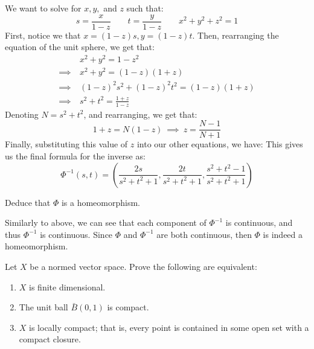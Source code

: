 \begin{soln}
    We want to solve for $ x, y, $ and $ z $ such that:
    \begin{equation*}
        s = \frac{x}{1-z} \qquad t = \frac{y}{1-z} \qquad x^{2}+y^{2}+z^{2}=1
    \end{equation*}
    First, notice we that $ x = (1-z)s, y = (1-z)t $.
    Then, rearranging the equation of the unit sphere, we get that:
    \begin{align*}
        & x^{2} + y^{2} = 1 - z^{2} \\
        \implies \ & x^{2} + y^{2} = (1-z)(1+z) \\
        \implies \ & (1-z)^{2}s^{2} + (1-z)^{2}t^{2} = (1-z)(1+z) \\
        \implies \ & s^{2} + t^{2} = \frac{1+z}{1-z}
    \end{align*}
    Denoting $ N = s^{2} + t^{2} $, and rearranging, we get that:
    \begin{equation*}
        1 + z = N(1 - z) \ \implies \ z = \frac{N - 1}{N + 1}
    \end{equation*}
    Finally, substituting this value of $ z $ into our other equations, we have:
    This gives us the final formula for the inverse as:
    \begin{equation*}
        \Phi^{-1}(s, t) = \left( \frac{2s}{s^{2} + t^{2} + 1},
        \frac{2t}{s^{2} + t^{2} + 1}, \frac{s^{2} + t^{2} - 1}{s^{2} + t^{2} + 1}
        \right)
    \end{equation*}
\end{soln}

\begin{qu}[num=23.4]
    Deduce that $ \Phi $ is a homeomorphism.
\end{qu}

\begin{soln}
    Similarly to above, we can see that each component of $ \Phi^{-1} $ is
    continuous, and thus $ \Phi^{-1} $ is continuous. \vsp
    Since $ \Phi $ and $ \Phi^{-1} $ are both continuous, then $ \Phi $ is indeed
    a homeomorphism.
\end{soln}


\newpage
\label{q24}
\begin{qu}[num=24]
    Let $ X $ be a normed vector space. Prove the following are equivalent:
    \begin{enumerate}
        \item $ X $ is finite dimensional.
        \item The unit ball $ \bar{B}(0, 1) $ is compact.
        \item $ X $ is locally compact; that is, every point is contained in some
            open set with a compact closure.
   \end{enumerate}
\end{qu}

